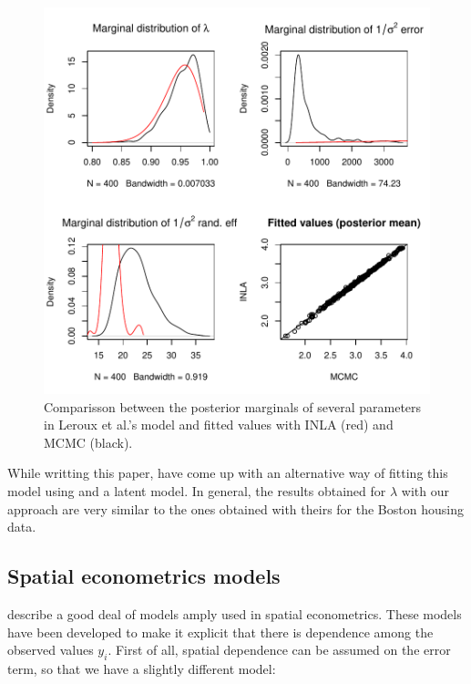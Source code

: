 \documentclass[article]{jss}
\begin{document}
\begin{figure}[h]
\begin{center}
\includegraphics{spatial_inla-027}
\end{center}
\caption{Comparisson between the posterior marginals of several parameters in 
Leroux et al.'s model and fitted values with INLA (red) and MCMC (black).}
\label{fig:leroux}
\end{figure}

While writting this paper, \citet{LeeMitchell:2013} have come up with an
alternative way of fitting this model using  and a 
latent model. In general, the results obtained for $\lambda$ with our approach
are very similar to the ones obtained with theirs for the Boston housing data.








\subsection{Spatial econometrics models}

\citet{LeSagePace:2009} describe a good deal of models amply used in spatial
econometrics. These models have been developed to make it explicit that there
is dependence among the observed values $y_i$. First of all, spatial dependence
can be assumed on the error term, so that we have a slightly different model:
\end{document}
